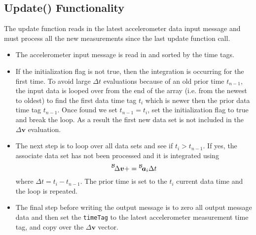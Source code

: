 \subsection{Update() Functionality}
The update function reads in the latest accelerometer data input message and must process all the new measurements since the last update function call.  
\begin{itemize}
	\item The accelerometer input message is read in and sorted by the time tags.
	\item If the initialization flag is not true, then the integration is occurring for the first time.  To avoid large $\Delta t$ evaluations because of an old prior time $t_{n-1}$, the input data is looped over from the end of the array (i.e. from the newest to oldest) to find the first data time tag $t_{i}$ which is newer then the prior data time tag $t_{n-1}$.  Once found we set $t_{n-1} = t_{i}$, set the initialization flag to true and break the loop.  As a result the first new data set is not included in the $\Delta\bm v$ evaluation.
	\item The next step is to loop over all data sets and see if $t_{i}>t_{n-1}$.  If yes, the associate data set has not been processed and it is integrated using $$\leftexp{B}{\Delta\bm v} += \leftexp{B}{\bm a_{i}} \Delta t$$ where $\Delta t = t_{i} - t_{n-1}$.  The prior time is set to the $t_{i}$ current data time and the loop is repeated.
	\item The final step before writing the output message is to zero all output message data and then set the {\tt timeTag} to the latest accelerometer measurement time tag, and copy over the $\Delta\bm v$ vector.
\end{itemize}